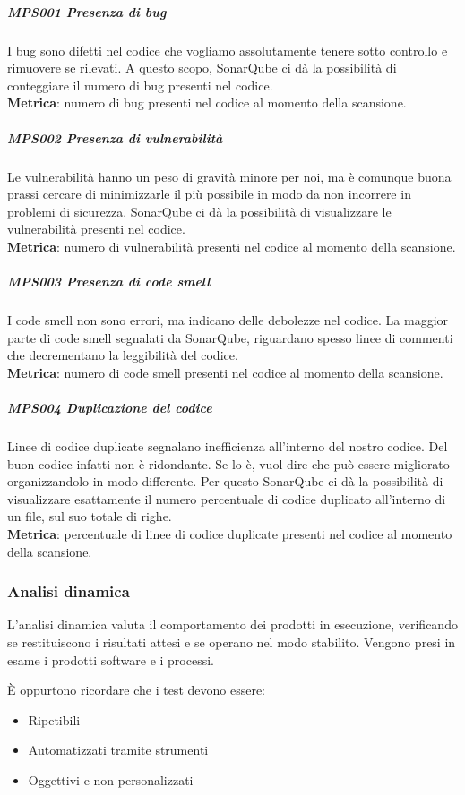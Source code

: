 			\subparagraph{MPS001 Presenza di bug} \label{presenzabug}
			I bug sono difetti nel codice che vogliamo assolutamente tenere sotto controllo e rimuovere se rilevati.
			A questo scopo, SonarQube ci dà la possibilità di conteggiare il numero di bug presenti nel codice. \\
			\textbf{Metrica}: numero di bug presenti nel codice al momento della scansione.

			\subparagraph{MPS002 Presenza di vulnerabilità} \label{presenzavulnerabilita}
			Le vulnerabilità hanno un peso di gravità minore per noi, ma è comunque buona prassi cercare di minimizzarle il più possibile in modo da non incorrere in problemi di sicurezza.
			SonarQube ci dà la possibilità di visualizzare le vulnerabilità presenti nel codice. \\
			\textbf{Metrica}: numero di vulnerabilità presenti nel codice al momento della scansione.

			\subparagraph{MPS003 Presenza di code smell} \label{presenzacodesmell}
			I code smell non sono errori, ma indicano delle debolezze nel codice.
			La maggior parte di code smell segnalati da SonarQube, riguardano spesso linee di commenti che decrementano la leggibilità del codice.  \\
			\textbf{Metrica}: numero di code smell presenti nel codice al momento della scansione.

			\subparagraph{MPS004 Duplicazione del codice} \label{duplicazionecodice}
			Linee di codice duplicate segnalano inefficienza all'interno del nostro codice.
			Del buon codice infatti non è ridondante.
			Se lo è, vuol dire che può essere migliorato organizzandolo in modo differente.
			Per questo SonarQube ci dà la possibilità di visualizzare esattamente il numero percentuale di codice duplicato all'interno di un file, sul suo totale di righe. \\
			\textbf{Metrica}: percentuale di linee di codice duplicate presenti nel codice al momento della scansione.
		
		
		\subsubsection{Analisi dinamica}\label{AnalisiDinamica}
		L'analisi dinamica valuta il comportamento dei prodotti in esecuzione, verificando se restituiscono i risultati attesi e se operano nel modo stabilito.
		Vengono presi in esame i prodotti software e i processi.
		
		È oppurtono ricordare che i test devono essere:
		\begin{itemize}
			\item Ripetibili
			\item Automatizzati tramite strumenti 
			\item Oggettivi e non personalizzati
		\end{itemize}
		
